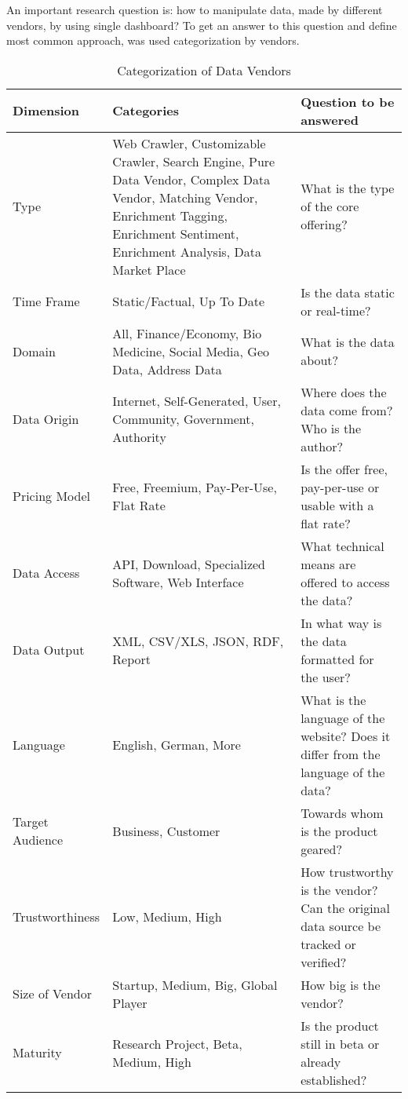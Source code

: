 	An important research question is: how to manipulate data, made by different vendors, by using single dashboard? To get an answer to this question and define most common approach, was used categorization by vendors\cite{schomm2013marketplaces}.
	\begin{table}[H]
	\centering
	\begin{tabular}{|L{2.5cm}|L{7cm}|L{6cm}|}
	\hline
	\textbf{Dimension} 			& \textbf{Categories} & \textbf{Question to be answered} \\
	\hline
	\hline 
	Type		                & Web Crawler, Customizable Crawler, Search Engine, Pure Data Vendor, Complex Data Vendor, Matching 
	                                   Vendor, Enrichment Tagging, Enrichment Sentiment, Enrichment Analysis, Data Market Place & What is the type of the core offering?  \\
	\hline
	Time Frame	                & Static/Factual, Up To Date & Is the data static or real-time?  \\
	\hline
	Domain		                & All, Finance/Economy, Bio Medicine, Social Media, Geo Data, Address Data & What is the data about?  \\
	\hline
	Data Origin                 & Internet, Self-Generated, User, Community, Government, Authority & Where does the data come 
	                                       from?Who is the author?  \\
	\hline
	Pricing Model		        & Free, Freemium, Pay-Per-Use, Flat Rate & Is the offer free, pay-per-use or usable with a flat rate? \\
	\hline
	Data Access		            & API, Download, Specialized Software, Web Interface & What technical means are offered to access the data? \\
	\hline
	Data Output		            & XML, CSV/XLS, JSON, RDF, Report& In what way is the data formatted for the user?  \\
	\hline
	Language 		            & English, German, More & What is the language of the website? Does it differ from the language of the 
	                                data? \\
	\hline 
	Target Audience		        & Business, Customer & Towards whom is the product geared?  \\
	\hline
	Trustworthiness	            & Low, Medium, High & How trustworthy is the vendor? Can the original data source be tracked or 
	                                 verified?  \\
	\hline 		
	Size of Vendor 		        & Startup, Medium, Big, Global Player & How big is the vendor?  \\
	\hline 
     Maturity                   & Research Project, Beta, Medium, High & Is the product still in beta or already established? \\
	\hline 
	\end{tabular}
	\caption[Categorization of Data Vendors]{Categorization of Data Vendors}
	\label{tab:categorization}
	\end{table}

